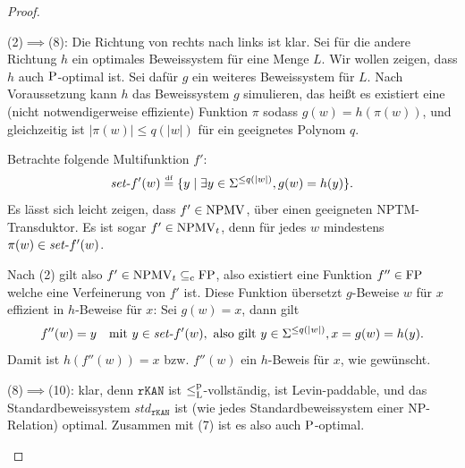 \begin{proof}
\begin{prooflist}[label={\arabic*.},labelsep=3pt]

\item (2)$\implies$(8): Die Richtung von rechts nach links ist klar. Sei für die andere Richtung $h$ ein optimales Beweissystem für eine Menge $L$. Wir wollen zeigen, dass $h$ auch $\P$-optimal ist. Sei dafür $g$ ein weiteres Beweissystem für $L$. Nach Voraussetzung kann $h$ das Beweissystem $g$ simulieren, das heißt es existiert eine (nicht notwendigerweise effiziente) Funktion $\pi$ sodass $g(w)=h(\pi(w))$, und gleichzeitig ist $|\pi(w)|\leq q(|w|)$ für ein geeignetes Polynom $q$.

Betrachte folgende Multifunktion $f'$:
\[ \fset{}f'(w) \defeq  \{ y \mid \exists y\in\Sigma^{\leq q(|w|)}, g(w)=h(y) \}. \]
Es lässt sich leicht zeigen, dass $f'\in\NPMV$, über einen geeigneten NPTM-Transduktor. 
Es ist sogar $f'\in\NPMV_t$, denn für jedes $w$ mindestens $\pi(w)\in \fset{}f'(w)$.

Nach (2) gilt also $f'\in\NPMV_t\subseteqc \FP$, also existiert eine Funktion $f''\in\FP$ welche eine Verfeinerung von $f'$ ist. Diese Funktion übersetzt $g$-Beweise $w$ für $x$ effizient in $h$-Beweise für $x$: 
Sei $g(w)=x$, dann gilt
\[ f''(w) = y \quad\text{mit } y\in\fset{}f'(w), \text{ also gilt } y\in\Sigma^{\leq q(|w|)}, x=g(w)=h(y). \]
Damit ist $h(f''(w))=x$ bzw. $f''(w)$ ein $h$-Beweis für $x$, wie gewünscht.


\item (8)$\implies$(10): klar, denn $\mathtt{rKAN}$ ist $\leqlp$-vollständig, ist Levin-paddable, und das Standardbeweissystem $\mathit{std}_\mathtt{rKAN}$ ist (wie jedes Standardbeweissystem einer NP-Relation) optimal. Zusammen mit (7) ist es also auch $\P$-optimal.
\end{prooflist}
\end{proof}


